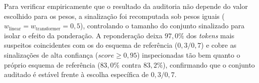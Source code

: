 Para verificar empiricamente que o resultado da auditoria não depende do valor escolhido para os pesos, a sinalização foi recomputada sob pesos iguais ($w_{\text{linear}} = w_{\text{transformer}} = 0{,}5$), controlando o tamanho do conjunto sinalizado para isolar o efeito da ponderação. A reponderação deixa $97{,}0\%$ dos \textit{tokens} mais suspeitos coincidentes com os do esquema de referência ($0{,}3/0{,}7$) e cobre as sinalizações de alta confiança ($\textit{score} \geq 0{,}95$) inspecionadas tão bem quanto o próprio esquema de referência ($83{,}0\%$ contra $83{,}2\%$), confirmando que o conjunto auditado é estável frente à escolha específica de $0{,}3/0{,}7$.
